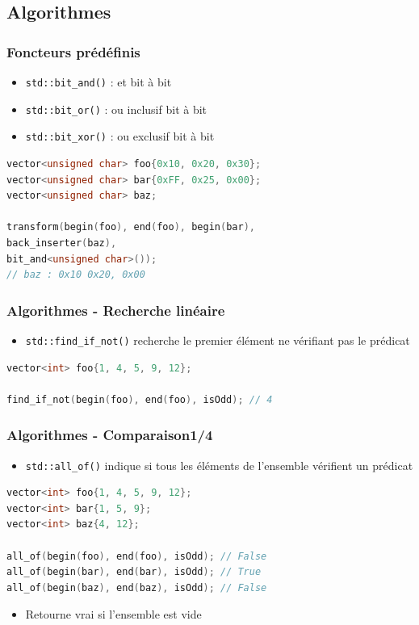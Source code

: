 \documentclass[C++.tex]{subfiles}
\begin{document}
\subsection*{Algorithmes}
\begin{frame}[fragile]
	\frametitle{Foncteurs prédéfinis}
	\begin{itemize}
		\item \lstinline|std::bit_and()| : et bit à bit
		\item \lstinline|std::bit_or()| : ou inclusif bit à bit
		\item \lstinline|std::bit_xor()| : ou exclusif bit à bit
	\end{itemize}

	\begin{lstlisting}[language=C++]
vector<unsigned char> foo{0x10, 0x20, 0x30};
vector<unsigned char> bar{0xFF, 0x25, 0x00};
vector<unsigned char> baz;

transform(begin(foo), end(foo), begin(bar), 
back_inserter(baz), 
bit_and<unsigned char>());
// baz : 0x10 0x20, 0x00\end{lstlisting}
\end{frame}

\begin{frame}[fragile]
	\frametitle{Algorithmes - Recherche linéaire}
	\begin{itemize}
		\item \lstinline|std::find_if_not()| recherche le premier élément ne vérifiant pas le prédicat
	\end{itemize}

	\begin{lstlisting}[language=C++]
vector<int> foo{1, 4, 5, 9, 12};

find_if_not(begin(foo), end(foo), isOdd); // 4\end{lstlisting}

\end{frame}

\begin{frame}[fragile]
	\frametitle{Algorithmes - Comparaison\titlehfill{}1/4}
	\begin{itemize}
		\item \lstinline|std::all_of()| indique si tous les éléments de l'ensemble vérifient un prédicat
	\end{itemize}

	\begin{lstlisting}[language=C++]
vector<int> foo{1, 4, 5, 9, 12};
vector<int> bar{1, 5, 9};
vector<int> baz{4, 12};

all_of(begin(foo), end(foo), isOdd); // False
all_of(begin(bar), end(bar), isOdd); // True
all_of(begin(baz), end(baz), isOdd); // False\end{lstlisting}

	\begin{itemize}
		\item Retourne vrai si l'ensemble est vide
	\end{itemize}
\end{frame}
\end{document}
